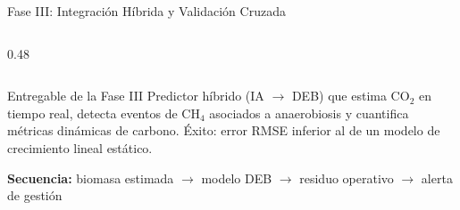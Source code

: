 \documentclass[aspectratio=169, 11pt]{beamer}
\begin{document}
\begin{frame}{Fase III: Integración Híbrida y Validación Cruzada}
\begin{columns}[T,onlytextwidth]
\begin{column}{0.48\textwidth}
\end{column}

\end{columns}

\vspace{0.20cm}

\begin{alertblock}{Entregable de la Fase III}
\scriptsize
Predictor híbrido (IA $\rightarrow$ DEB) que estima CO$_2$ en tiempo real, detecta eventos de CH$_4$ asociados a anaerobiosis y cuantifica métricas dinámicas de carbono. Éxito: error RMSE inferior al de un modelo de crecimiento lineal estático.
\end{alertblock}

\vspace{0.15cm}
\centering
\scriptsize
\textbf{Secuencia:} biomasa estimada $\rightarrow$ modelo DEB $\rightarrow$ residuo operativo $\rightarrow$ alerta de gestión
\end{frame}

\end{document}
